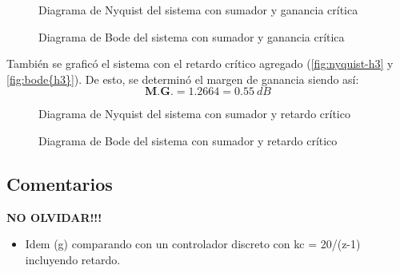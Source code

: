 \begin{figure}[h]
  \centering
  
  \caption{Diagrama de Nyquist del sistema con sumador y ganancia crítica}
  \label{fig:nyquist-h2}
\end{figure}

\begin{figure}[h]
  \centering
  
  \caption{Diagrama de Bode del sistema con sumador y ganancia crítica}
  \label{fig:bode-h2}
\end{figure}

También se graficó el sistema con el retardo crítico agregado (\autoref{fig:nyquist-h3} y
\autoref{fig:bode{h3}}). De esto, se determinó el margen de ganancia siendo así:
\begin{equation}
  \boxed{\textbf{M.G.} = 1.2664 = 0.55\ \unit{dB}}
\end{equation}

\begin{figure}[h]
  \centering
  
  \caption{Diagrama de Nyquist del sistema con sumador y retardo crítico}
  \label{fig:nyquist-h3}
\end{figure}

\begin{figure}[h]
  \centering
  
  \caption{Diagrama de Bode del sistema con sumador y retardo crítico}
  \label{fig:bode-h3}
\end{figure}


\FloatBarrier
\subsection{Comentarios}

\textbf{NO OLVIDAR!!!}


\begin{itemize}
  \item Idem (g) comparando con un controlador discreto con kc = 20/(z-1) incluyendo retardo.
\end{itemize}
